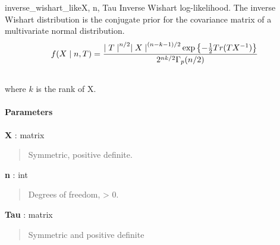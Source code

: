 \hypertarget{pymc.distributions.inverse_wishart_like}{}
\begin{funcdesc}{inverse\_wishart\_like}{X, n, Tau}
Inverse Wishart log-likelihood. The inverse Wishart distribution is the conjugate 
prior for the covariance matrix of a multivariate normal distribution.
\begin{gather}
\begin{split}f(X \mid n, T) = \frac{{\mid T \mid}^{n/2}{\mid X \mid}^{(n-k-1)/2} \exp\left\{ -\frac{1}{2} Tr(TX^{-1}) \right\}}{2^{nk/2} \Gamma_p(n/2)}\end{split}\notag\\\begin{split}\end{split}\notag
\end{gather}
where $k$ is the rank of X.
\paragraph{Parameters}\begin{paramlist}

\item[] \textbf{X} : matrix
\begin{quote}

Symmetric, positive definite.
\end{quote}

\item[] \textbf{n} : int
\begin{quote}

Degrees of freedom, \textgreater{} 0.
\end{quote}

\item[] \textbf{Tau} : matrix
\begin{quote}

Symmetric and positive definite
\end{quote}
\end{paramlist}
\end{funcdesc}

